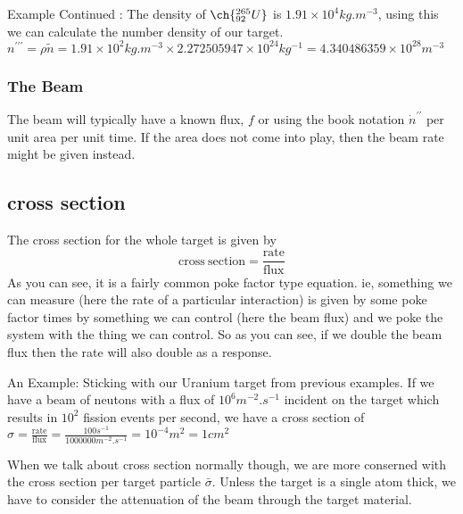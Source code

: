 \begin{framed}
  Example Continued : The density of $\ch{^{265}_{92}U}$ is $1.91 \times 10^4 kg.m^{-3}$, using this we can calculate the number density of our target.
  $n^{\prime\prime\prime}=\rho \tilde{n} = 1.91\times10^2 kg.m^{-3} \times 2.272505947\times10^{24}kg^{-1} = 4.340486359\times10^{28} m^{-3}$
\end{framed}

\subsubsection{The Beam}
The beam will typically have a known flux, $f$ or using the book notation $\dot{n}^{\prime\prime}$ per unit area per unit time. If the area does not come into play, then the beam rate might be given instead.

\subsection{cross section}
The cross section for the whole target is given by
\begin{equation}
  \label{eq:target_cross_section}
\mathrm{cross\:section} = \frac{\mathrm{rate}}{\mathrm{flux}}
\end{equation}
As you can see, it is a fairly common poke factor type equation. ie, something we can measure (here the rate of a particular interaction) is given by some poke factor times by something we can control (here the beam flux) and we poke the system with the thing we can control. So as you can see, if we double the beam flux then the rate will also double as a response.

\begin{framed}
  An Example: Sticking with our Uranium target from previous examples. If we have a beam of neutons with a flux of $10^{6}m^{-2}.s^{-1}$ incident on the target which results in $10^{2}$ fission events per second, we have a cross section of $\sigma = \frac{\mathrm{rate}}{\mathrm{flux}}=\frac{100s^{-1}}{1000000m^{-2}.s^{-1}}=10^{-4}m^{2}=1cm^{2}$
\end{framed}

When we talk about cross section normally though, we are more conserned with the cross section per target particle $\bar{\sigma}$. Unless the target is a single atom thick, we have to consider the attenuation of the beam through the target material.
